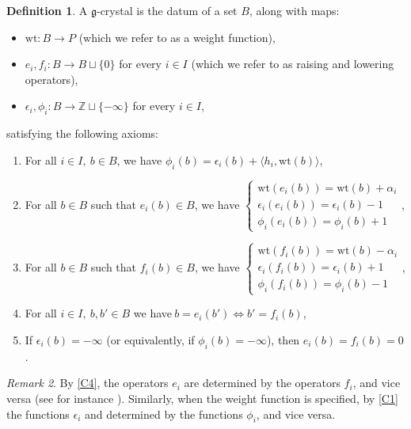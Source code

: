 \documentclass[a4paper,12pt]{article}
\theoremstyle{definition}
\newtheorem{definition}{Definition}[section]
\theoremstyle{plain}
\theoremstyle{remark}
\newtheorem{remark}[definition]{Remark}
\newcommand\bbZ{\mathbb{Z}}
\begin{document}
\begin{definition}
A $\mathfrak{g}$-crystal is the datum of a set $B$, along with maps:
\begin{itemize}
\item $\mathrm{wt} \colon B\rightarrow P$ (which we refer to as a weight function),
\item $e_i,f_i \colon B\rightarrow B\sqcup\{0\}$ for every $i\in I$ (which we refer to as raising and lowering operators),
\item $\epsilon_i,\phi_i \colon B\rightarrow\bbZ\sqcup\{-\infty\}$ for every $i\in I$,
\end{itemize}
satisfying the following axioms:
\begin{enumerate}[label=(C\arabic*)]
\item\label{C1} For all $i\in I,\ b\in B$, we have $ \phi_i(b)=\epsilon_i(b)+\langle h_i,\mathrm{wt}(b)\rangle$,
\item\label{C2} For all $b\in B$ such that $e_i(b)\in B$, we have 
$
\left\{
\begin{array}{l}
\mathrm{wt}(e_i(b))=\mathrm{wt}(b)+\alpha_i \\
\epsilon_i(e_i(b))=\epsilon_i(b)-1 \\
\phi_i(e_i(b))=\phi_i(b)+1
\end{array}
\right.
$,
\item\label{C3} For all $b\in B$ such that $f_i(b)\in B$, we have $
\left\{
\begin{array}{l}
\mathrm{wt}(f_i(b))=\mathrm{wt}(b)-\alpha_i \\
\epsilon_i(f_i(b))=\epsilon_i(b)+1 \\
\phi_i(f_i(b))=\phi_i(b)-1
\end{array}
\right.
$,
\item\label{C4} For all $ i\in I,\ b,b'\in B$ we have$\ b=e_i(b')\Leftrightarrow b'=f_i(b)$,
\item\label{C5} If $\epsilon_i(b)=-\infty$ (or equivalently, if $\phi_i(b)=-\infty$), then $e_i(b)=f_i(b)=0$.
\end{enumerate}
\end{definition}

\begin{remark}\label{Rem/crystalOperatorsE/F}
By \ref{C4}, the operators $e_i$ are determined by the operators $f_i$, and vice versa (see for instance \cite[\S7]{BK10}). Similarly, when the weight function is specified, by \ref{C1} the functions $\epsilon_i$ and determined by the functions $\phi_i$, and vice versa.
\end{remark}
\end{document}
